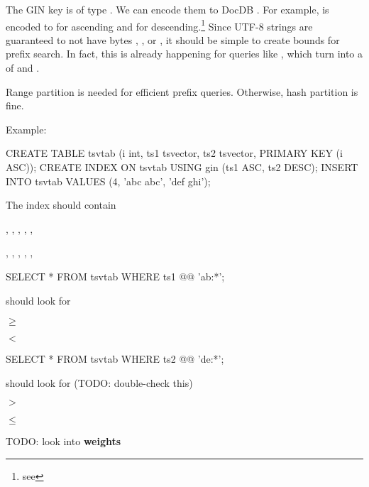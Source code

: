 The GIN key is of type .  We can encode them to DocDB
.  For example,  is encoded to
 for ascending and
 for descending.\footnote{see
}  Since UTF-8 strings are guaranteed to not
have bytes , , or , it
should be simple to create bounds for prefix search.  In fact, this is already
happening for queries like , which turn into a
 of  and .

Range partition is needed for efficient prefix queries.  Otherwise, hash
partition is fine.

Example:

\begin{sqlcode}
CREATE TABLE tsvtab (i int, ts1 tsvector, ts2 tsvector, PRIMARY KEY (i ASC));
CREATE INDEX ON tsvtab USING gin (ts1 ASC, ts2 DESC);
INSERT INTO tsvtab VALUES (4, 'abc abc', 'def ghi');
\end{sqlcode}

The index should contain

\begin{oparts}
\item
  , ,
  , \textinline{!},
  , 
\item
  , ,
  , \textinline{!},
  , 
\end{oparts}

\begin{sqlcode}
SELECT * FROM tsvtab WHERE ts1 @@ 'ab:*';
\end{sqlcode}

should look for

\begin{oparts}
\item
  $\geq$ 
\item
  $<$ 
\end{oparts}

\begin{sqlcode}
SELECT * FROM tsvtab WHERE ts2 @@ 'de:*';
\end{sqlcode}

should look for (TODO: double-check this)

\begin{oparts}
\item
  $>$ 
\item
  $\leq$ 
\end{oparts}

TODO: look into  \textbf{weights}
